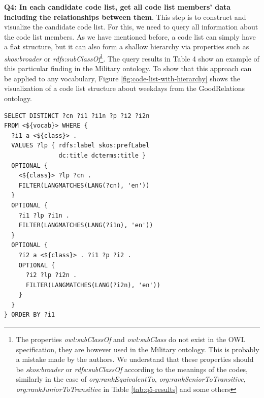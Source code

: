 \medskip
\noindent\textbf{Q4: In each candidate code list, get all code list members' data including the relationships between them}. This step is to construct and visualize the candidate code list. For this, we need to query all information about the code list members. As we have mentioned before, a code list can simply have a flat structure, but it can also form a shallow hierarchy via properties such as \textit{skos:broader} or \textit{rdfs:subClassOf}\footnote{\label{note:owlSubClass}The properties \textit{owl:subClassOf} and \textit{owl:subClass} do not exist in the OWL specification, they are however used in the Military ontology. This is probably a mistake made by the authors. We understand that these properties should be \textit{skos:broader} or \textit{rdfs:subClassOf} according to the meanings of the codes, similarly in the case of \textit{org:rankEquivalentTo}, \textit{org:rankSeniorToTransitive}, \textit{org:rankJuniorToTransitive} in Table \ref{tab:q5-results} and some others}. The query results in Table 4 show an example of this particular finding in the Military ontology. To show that this approach can be applied to any vocabulary, Figure \ref{fig:code-list-with-hierarchy} shows the visualization of a code list structure about weekdays from the GoodRelations ontology.


\begin{lstlisting}[captionpos=b, caption=Q4 -- Query to get candidate code list structure,label=lst:sparql4,basicstyle=\small\ttfamily,frame=single]
SELECT DISTINCT ?cn ?i1 ?i1n ?p ?i2 ?i2n
FROM <${vocab}> WHERE {
  ?i1 a <${class}> .
  VALUES ?lp { rdfs:label skos:prefLabel
               dc:title dcterms:title }
  OPTIONAL {
    <${class}> ?lp ?cn . 
    FILTER(LANGMATCHES(LANG(?cn), 'en'))
  }
  OPTIONAL {
    ?i1 ?lp ?i1n . 
    FILTER(LANGMATCHES(LANG(?i1n), 'en'))
  }
  OPTIONAL {
    ?i2 a <${class}> . ?i1 ?p ?i2 .
    OPTIONAL { 
      ?i2 ?lp ?i2n . 
      FILTER(LANGMATCHES(LANG(?i2n), 'en'))
    }
  }
} ORDER BY ?i1
\end{lstlisting}

